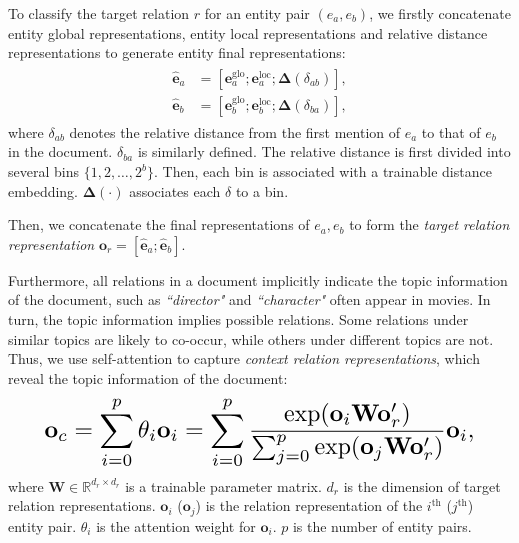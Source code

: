 \documentclass[11pt,a4paper]{article}
\begin{document}
To classify the target relation $r$ for an entity pair $(e_a,e_b)$, we firstly concatenate entity global representations, entity local representations and relative distance representations to generate entity final representations: 
\begin{align}
\begin{aligned}
\mathbf{\hat{e}}_a &= [\mathbf{e}_a^\textrm{glo}; \mathbf{e}_a^\textrm{loc}; \mathbf{\Delta}(\delta_{ab})], \\
\mathbf{\hat{e}}_b &= [\mathbf{e}_b^\textrm{glo}; \mathbf{e}_b^\textrm{loc}; \mathbf{\Delta}(\delta_{ba})],
\end{aligned}
\end{align}
where $\delta_{ab}$ denotes the relative distance from the first mention of $e_a$ to that of $e_b$ in the document. $\delta_{ba}$ is similarly defined. The relative distance is first divided into several bins $\{1,2,\ldots,2^b\}$. Then, each bin is associated with a trainable distance embedding. $\mathbf{\Delta}(\cdot)$ associates each $\delta$ to a bin.

Then, we concatenate the final representations of $e_a,e_b$ to form the \emph{target relation representation} $\mathbf{o}_r = [\mathbf{\hat{e}}_a; \mathbf{\hat{e}}_b]$.

Furthermore, all relations in a document implicitly indicate the topic information of the document, such as \textit{``director"} and \textit{``character"} often appear in movies. In turn, the topic information implies possible relations. Some relations under similar topics are likely to co-occur, while others under different topics are not. Thus, we use self-attention  \cite{sorokin2017context} to capture \emph{context relation representations}, which reveal the topic information of the document:
\begin{align}
\resizebox{.89\columnwidth}{!}{$\begin{aligned}
\mathbf{o}_c = \sum_{i=0}^p \theta_i \mathbf{o}_i = \sum_{i=0}^p \frac{\mathrm{exp}(\mathbf{o}_i \mathbf{W} \mathbf{o}_r^\prime)}
{\sum_{j=0}^p \mathrm{exp}(\mathbf{o}_j \mathbf{W} \mathbf{o}_r^\prime)} \mathbf{o}_i,
\end{aligned}$}
\end{align}
where $\mathbf{W}\in\mathbb{R}^{d_r\times d_r}$ is a trainable parameter matrix. $d_r$ is the dimension of target relation representations. $\mathbf{o}_i$ ($\mathbf{o}_j$) is the relation representation of the $i^\textrm{th}$ ($j^\textrm{th}$) entity pair. $\theta_i$ is the attention weight for $\mathbf{o}_i$. $p$ is the number of entity pairs.
\end{document}
